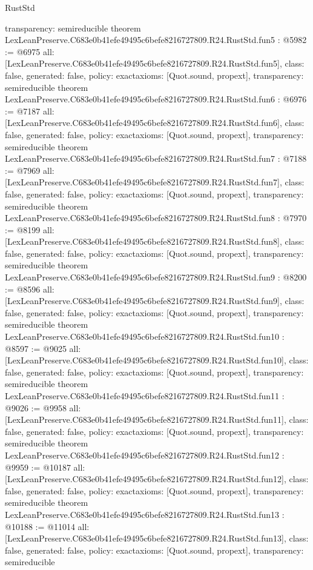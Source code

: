 \begin{lexlean}{RustStd}
\begin{coremodule}
{  transparency: semireducible
}
theorem LexLeanPreserve.C683e0b41efe49495c6befe8216727809.R24.RustStd.fun5 : @5982 := @6975 {
  all: [LexLeanPreserve.C683e0b41efe49495c6befe8216727809.R24.RustStd.fun5],
  class: false,
  generated: false,
  policy: exact{axioms: [Quot.sound, propext]},
  transparency: semireducible
}
theorem LexLeanPreserve.C683e0b41efe49495c6befe8216727809.R24.RustStd.fun6 : @6976 := @7187 {
  all: [LexLeanPreserve.C683e0b41efe49495c6befe8216727809.R24.RustStd.fun6],
  class: false,
  generated: false,
  policy: exact{axioms: [Quot.sound, propext]},
  transparency: semireducible
}
theorem LexLeanPreserve.C683e0b41efe49495c6befe8216727809.R24.RustStd.fun7 : @7188 := @7969 {
  all: [LexLeanPreserve.C683e0b41efe49495c6befe8216727809.R24.RustStd.fun7],
  class: false,
  generated: false,
  policy: exact{axioms: [Quot.sound, propext]},
  transparency: semireducible
}
theorem LexLeanPreserve.C683e0b41efe49495c6befe8216727809.R24.RustStd.fun8 : @7970 := @8199 {
  all: [LexLeanPreserve.C683e0b41efe49495c6befe8216727809.R24.RustStd.fun8],
  class: false,
  generated: false,
  policy: exact{axioms: [Quot.sound, propext]},
  transparency: semireducible
}
theorem LexLeanPreserve.C683e0b41efe49495c6befe8216727809.R24.RustStd.fun9 : @8200 := @8596 {
  all: [LexLeanPreserve.C683e0b41efe49495c6befe8216727809.R24.RustStd.fun9],
  class: false,
  generated: false,
  policy: exact{axioms: [Quot.sound, propext]},
  transparency: semireducible
}
theorem LexLeanPreserve.C683e0b41efe49495c6befe8216727809.R24.RustStd.fun10 : @8597 := @9025 {
  all: [LexLeanPreserve.C683e0b41efe49495c6befe8216727809.R24.RustStd.fun10],
  class: false,
  generated: false,
  policy: exact{axioms: [Quot.sound, propext]},
  transparency: semireducible
}
theorem LexLeanPreserve.C683e0b41efe49495c6befe8216727809.R24.RustStd.fun11 : @9026 := @9958 {
  all: [LexLeanPreserve.C683e0b41efe49495c6befe8216727809.R24.RustStd.fun11],
  class: false,
  generated: false,
  policy: exact{axioms: [Quot.sound, propext]},
  transparency: semireducible
}
theorem LexLeanPreserve.C683e0b41efe49495c6befe8216727809.R24.RustStd.fun12 : @9959 := @10187 {
  all: [LexLeanPreserve.C683e0b41efe49495c6befe8216727809.R24.RustStd.fun12],
  class: false,
  generated: false,
  policy: exact{axioms: [Quot.sound, propext]},
  transparency: semireducible
}
theorem LexLeanPreserve.C683e0b41efe49495c6befe8216727809.R24.RustStd.fun13 : @10188 := @11014 {
  all: [LexLeanPreserve.C683e0b41efe49495c6befe8216727809.R24.RustStd.fun13],
  class: false,
  generated: false,
  policy: exact{axioms: [Quot.sound, propext]},
  transparency: semireducible
}
\end{coremodule}
\end{lexlean}
